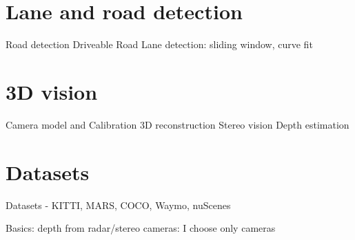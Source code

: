\section{Lane and road detection}
Road detection
Driveable Road
Lane detection: sliding window, curve fit
\section{3D vision}
Camera model and Calibration
3D reconstruction
Stereo vision
Depth estimation
\section{Datasets}
Datasets - KITTI, MARS, COCO, Waymo, nuScenes


Basics: depth from radar/stereo cameras: I choose only cameras










